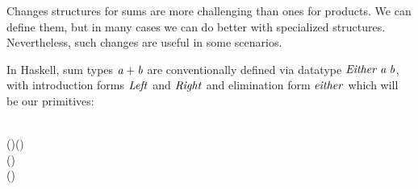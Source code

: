 Changes structures for sums are more challenging than ones for products. We can
define them, but in many cases we can do better with specialized structures.
Nevertheless, such changes are useful in some scenarios.

In Haskell, sum types \ensuremath{\Varid{a}\mathbin{+}\Varid{b}} are conventionally defined via datatype \ensuremath{\Conid{Either}\;\Varid{a}\;\Varid{b}}, with introduction forms \ensuremath{\Conid{Left}} and \ensuremath{\Conid{Right}} and elimination form \ensuremath{\Varid{either}}
which will be our primitives:
\begin{hscode}\SaveRestoreHook
{}%
%
\>[B]{}\;\;\;\mathrel{=}\;\mid {}\;\<[E]%
\\[\blanklineskip]%
\>[B]{}\mathrel{:\mkern-1mu:}(\to {})\to (\to {})\to {}\;\;\to {}\<[E]%
\\
\>[B]{}\;\;\;(\;)\mathrel{=}\;\<[E]%
\\
\>[B]{}\;\;\;(\;)\mathrel{=}\;\<[E]%
\ColumnHook
\end{hscode}\resethooks

